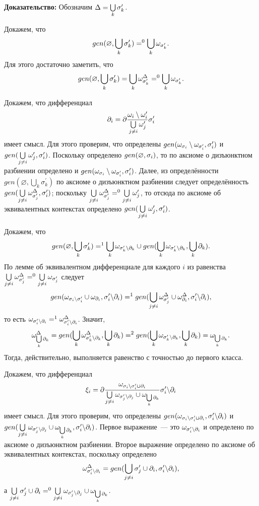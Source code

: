 \textbf{Доказательство:}
Обозначим $\Delta = \bigcup\limits_k {\sigma^\prime_k}$.

Докажем, что $$gen(\varnothing, \bigcup\limits_k {\sigma^\prime_k}) =^0 \bigcup\limits_k \omega_{{\sigma^\prime_k}}.$$ 
Для этого достаточно заметить, что $$gen(\varnothing, \bigcup\limits_k {\sigma^\prime_k}) = \bigcup\limits_k \omega^\Delta_{{\sigma^\prime_k}} =^0 \bigcup\limits_k \omega_{{\sigma^\prime_k}}.$$

Докажем, что дифференциал $$\partial_i = \partial\dfrac{\omega_i \setminus \omega_i^\prime}{\bigcup\limits_{j \neq i}\omega^\prime_j} \sigma_i^\prime$$ имеет смысл. Для этого проверим, что определены $gen(\omega_{{\sigma_i}} \setminus \omega_{{\sigma^\prime_i}}, {\sigma^\prime_i})$ и $gen(\bigcup\limits_{j \neq i}\omega^\prime_j, {\sigma^\prime_i})$. Поскольку определено $gen(\varnothing, {\sigma_i})$, то по аксиоме о дизъюнктном разбиении определено и $gen(\omega_{{\sigma_i}} \setminus \omega_{{\sigma^\prime_i}}, {\sigma^\prime_i})$. Далее, из определённости $gen(\varnothing, \bigcup\limits_k \sigma^\prime_k)$ по аксиоме о дизъюнктном разбиении следует определённость $gen(\bigcup\limits_{j \neq i}\omega^\Delta_{\sigma^\prime_j}, {\sigma^\prime_i})$; поскольку $\bigcup\limits_{j \neq i}\omega^\Delta_{\sigma^\prime_j} =^0 \bigcup\limits_{j \neq i}\omega^\prime_j$, то отсюда по аксиоме об эквивалентных контекстах определено $gen(\bigcup\limits_{j \neq i}\omega^\prime_j, {\sigma^\prime_i})$.

Докажем, что $$gen(\varnothing, \bigcup\limits_k {\sigma^\prime_k}) =^1 \bigcup\limits_k \omega_{{\sigma^\prime_k}{\setminus}{\partial_k}} \cup gen(\bigcup\limits_k \omega_{{\sigma^\prime_k}{\setminus}{\partial_k}}, \bigcup\limits_k {\partial_k}).$$ 
По лемме об эквивалентном дифференциале для каждого $i$ из равенства $\bigcup\limits_{j \neq i}\omega^\Delta_{{\sigma^\prime_j}} =^0 \bigcup\limits_{j \neq i} \omega_{{\sigma^\prime_j}}$ следует $$gen(\omega_{{\sigma_i}{\setminus}{\sigma^\prime_i}} \cup \omega_{\partial_i}, {\sigma^\prime_i}{\setminus}{\partial_i}) =^1 gen(\bigcup\limits_{j \neq i}\omega^\Delta_{{\sigma^\prime_j}} \cup \omega^\Delta_{\partial_i}, {\sigma^\prime_i}{\setminus}{\partial_i}),$$ 
то есть $\omega_{{\sigma^\prime_i}{\setminus}{\partial_i}} =^1 \omega^\Delta_{{\sigma^\prime_i}{\setminus}{\partial_i}}$. Значит, $$\omega^\Delta_{\bigcup\limits_k {\partial_k}} = gen(\bigcup\limits_k \omega^\Delta_{{\sigma^\prime_k}{\setminus}{\partial_k}}, \bigcup\limits_k {\partial_k}) =^2 gen(\bigcup\limits_k \omega_{{\sigma^\prime_k}{\setminus}{\partial_k}}, \bigcup\limits_k {\partial_k}) = \omega_{\bigcup\limits_k {\partial_k}}.$$ 
Тогда, действительно, выполняется равенство с точностью до первого класса.

Докажем, что дифференциал $$\xi_i = \partial\dfrac{\omega_{{\sigma_i}{\setminus}{\sigma^\prime_i} \cup {\partial_i}}}{\bigcup\limits_{j \neq i} \omega_{{\sigma^\prime_j}{\setminus}{\partial_j}} \cup \omega_{\bigcup\limits_k \partial_k}} {\sigma^\prime_i}{\setminus}{\partial_i}$$ имеет смысл. Для этого проверим, что определены $gen(\omega_{{\sigma_i}{\setminus}{\sigma^\prime_i} \cup {\partial_i}}, {\sigma^\prime_i}{\setminus}{\partial_i})$ и $gen(\bigcup\limits_{j \neq i} \omega_{{\sigma^\prime_j}{\setminus}{\partial_j}} \cup \omega_{\bigcup\limits_k \partial_k}, {\sigma^\prime_i}{\setminus}{\partial_i})$. Первое выражение~--- это $\omega_{{\sigma^\prime_i}{\setminus}{\partial_i}}$ и определено по аксиоме о дизъюнктном разбиении. Второе выражение определено по аксиоме об эквивалентных контекстах, поскольку определено $$\omega^\Delta_{{\sigma^\prime_i}{\setminus}{\partial_i}} = gen(\bigcup\limits_{j \neq i} {\sigma^\prime_j} \cup {\partial_i}, {\sigma^\prime_i}{\setminus}{\partial_i}),$$ 
а $\bigcup\limits_{j \neq i} {\sigma^\prime_j} \cup {\partial_i} =^0 \bigcup\limits_{j \neq i} \omega_{{\sigma^\prime_j}{\setminus}{\partial_j}} \cup \omega_{\bigcup\limits_k \partial_k}$.

